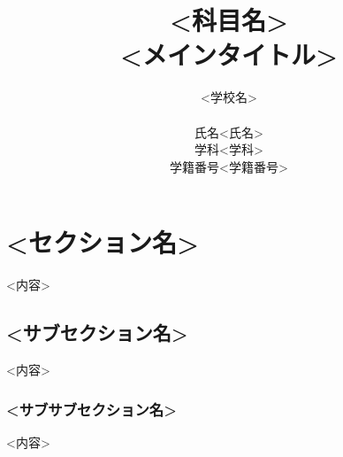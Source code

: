 \documentclass{ltjsarticle}
\begin{document}
  \title{<科目名>\\
  \huge <メインタイトル>}
  \author{<学校名>\\
  \begin{tabular}{rl}
    氏名 & <氏名>\\
    学科 & <学科>\\
    学籍番号 & <学籍番号>
  \end{tabular}}
  \maketitle
  \section{<セクション名>}
  <内容>
  \subsection{<サブセクション名>}
  <内容>
  \subsubsection{<サブサブセクション名>}
  <内容>
\end{document}
